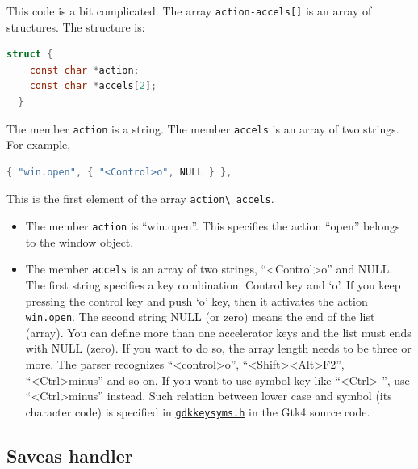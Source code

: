 This code is a bit complicated. The array
\passthrough{\lstinline!action-accels[]!} is an array of structures. The
structure is:

\begin{lstlisting}[language=C]
  struct {
    const char *action;
    const char *accels[2];
  }
\end{lstlisting}

The member \passthrough{\lstinline!action!} is a string. The member
\passthrough{\lstinline!accels!} is an array of two strings. For
example,

\begin{lstlisting}[language=C]
{ "win.open", { "<Control>o", NULL } },
\end{lstlisting}

This is the first element of the array
\passthrough{\lstinline!action\_accels!}.

\begin{itemize}
\tightlist
\item
  The member \passthrough{\lstinline!action!} is ``win.open''. This
  specifies the action ``open'' belongs to the window object.
\item
  The member \passthrough{\lstinline!accels!} is an array of two
  strings, ``\textless Control\textgreater o'' and NULL. The first
  string specifies a key combination. Control key and `o'. If you keep
  pressing the control key and push `o' key, then it activates the
  action \passthrough{\lstinline!win.open!}. The second string NULL (or
  zero) means the end of the list (array). You can define more than one
  accelerator keys and the list must ends with NULL (zero). If you want
  to do so, the array length needs to be three or more. The parser
  recognizes ``\textless control\textgreater o'',
  ``\textless Shift\textgreater\textless Alt\textgreater F2'',
  ``\textless Ctrl\textgreater minus'' and so on. If you want to use
  symbol key like ``\textless Ctrl\textgreater-'', use
  ``\textless Ctrl\textgreater minus'' instead. Such relation between
  lower case and symbol (its character code) is specified in
  \href{https://gitlab.gnome.org/GNOME/gtk/-/blob/master/gdk/gdkkeysyms.h}{\passthrough{\lstinline!gdkkeysyms.h!}}
  in the Gtk4 source code.
\end{itemize}

\hypertarget{saveas-handler}{%
\subsection{Saveas handler}\label{saveas-handler}}

